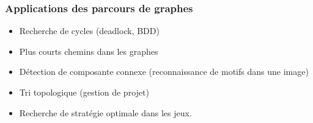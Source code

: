 \subsubsection*{Applications des parcours de graphes}
\begin{itemize}
\item Recherche de cycles (deadlock, BDD)
\item Plus courts chemins dans les graphes
\item Détection de composante connexe (reconnaissance de motifs dans une image)
\item Tri topologique (gestion de projet)
\item Recherche de stratégie optimale dans les jeux.
\end{itemize}